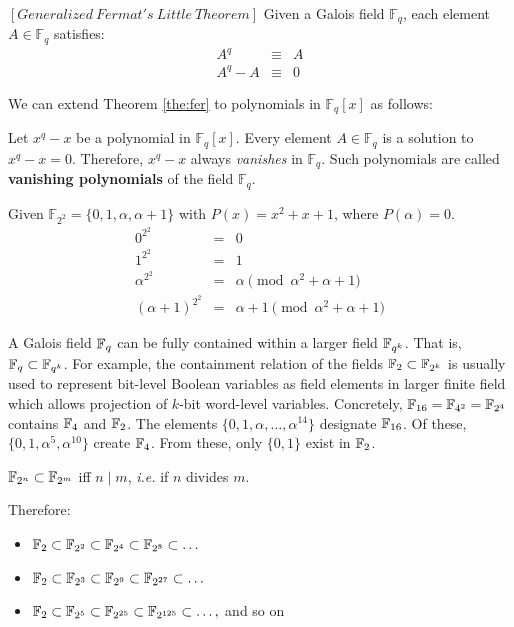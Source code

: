 \begin{Theorem}\label{the:fer}
 $\left[Generalized\  Fermat's\  Little\  Theorem \right]$ Given a
 Galois field $\mathbb{F}_{q}$, each element $A \in \mathbb{F}_{q}$ satisfies: 
\begin{eqnarray}\label{fe}
 A^{q} & \equiv & A  \nonumber \\
 A^{q} - A & \equiv& 0  
\end{eqnarray}
\end{Theorem} 

We can extend Theorem \ref{the:fer} to polynomials in $\mathbb{F}_{q}[x]$ as 
follows: 
\begin{Definition}
Let $x^q-x$ be a polynomial in $\mathbb{F}_{q}[x]$.
Every element $A \in \mathbb{F}_{q}$ is a solution to  $x^q-x=0$. 
Therefore, $x^{q} - x$ always {\it vanishes} in $\mathbb{F}_{q}$. Such 
polynomials are called {\bf vanishing polynomials} of the field $\mathbb{F}_{q}$.
\end{Definition}

\begin{Example}
Given $\mathbb{F}_{2^2} =\{0,1,\alpha,\alpha+1\}$ with $P(x)=x^2+x+1$, where $P(\alpha)=0$. 
 \begin{eqnarray}
 0^{2^2}&=&0 \nonumber \\
 1^{2^2}&=&1 \nonumber \\
 \alpha^{2^2}&=&\alpha \pmod {\alpha^2+\alpha+1}\nonumber \\
 (\alpha+1)^{2^2}&=&\alpha+1 \pmod {\alpha^2+\alpha+1} \nonumber 
 \end{eqnarray}
\end{Example}

A Galois field ${\mathbb{F}}_q$ can be fully contained within a larger field ${\mathbb{F}}_{q^k}$.
That is, ${\mathbb{F}}_q \subset {\mathbb{F}}_{q^k}$.
For example, the containment relation of the fields 
${\mathbb{F}}_2 \subset {\mathbb{F}}_{2^k}$ is usually used to represent bit-level Boolean variables as field elements
in larger finite field which allows projection of $k$-bit word-level variables. 
Concretely, ${\mathbb{F}}_{16}={\mathbb{F}}_{4^2}={\mathbb{F}}_{2^4}$ contains ${\mathbb{F}}_4$ and ${\mathbb{F}}_2$.
The elements $\{0,1,\alpha,\dots,\alpha^{14}\}$
designate ${\mathbb{F}}_{16}$. Of these, $\{0,1,\alpha^5,\alpha^{10}\}$ create ${\mathbb{F}}_4$.
From these, only $\{0,1\}$ exist in ${\mathbb{F}}_2$.

\begin{Theorem}
${\mathbb{F}}_{2^n}\subset{\mathbb{F}}_{2^m}$ iff $n \mid m$, {\it i.e.} if $n$ divides $m$.
\end{Theorem}

Therefore:
\begin{itemize}
\item ${\mathbb{F}}_2 \subset {\mathbb{F}}_{2^2} \subset {\mathbb{F}}_{2^4} \subset {\mathbb{F}}_{2^8} \subset \dots$
\item ${\mathbb{F}}_2 \subset {\mathbb{F}}_{2^3} \subset {\mathbb{F}}_{2^9} \subset {\mathbb{F}}_{2^{27}} \subset \dots$
\item ${\mathbb{F}}_2 \subset {\mathbb{F}}_{2^5} \subset {\mathbb{F}}_{2^{25}} \subset {\mathbb{F}}_{2^{125}} \subset \dots,$ and so on
\end{itemize}

